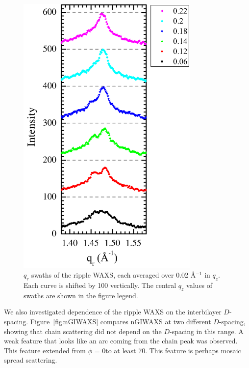 \begin{figure}[htbp]
  \centering
  \includegraphics[width=0.8\textwidth]{figures/ripple/nGIWAXS/qrplots}
  \caption{$q_r$ swaths of the ripple WAXS, each averaged over 0.02 \AA$^{-1}$
  in $q_z$. Each curve is shifted by 100 vertically. 
  The central $q_z$ values of swaths are shown in the figure legend.}
  \label{fig:qrplots}
\end{figure}

We also investigated dependence of the ripple WAXS on the interbilayer
$D$-spacing. Figure~\ref{fig:nGIWAXS} compares nGIWAXS at two different $D$-spacing,
showing that chain scattering did not depend on the $D$-spacing in this range. 
A weak feature that looks like an 
arc coming from the chain peak was observed. This feature extended
from $\phi$ = 0\textdegree to at least 70\textdegree. This feature
is perhaps mosaic spread scattering.

